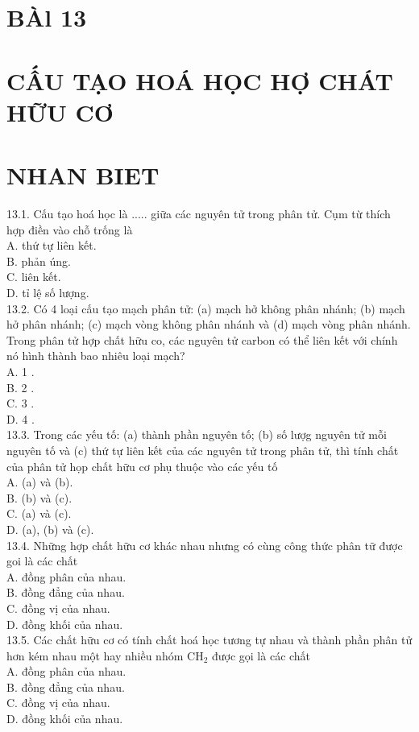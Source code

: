 \documentclass[10pt]{article}
\begin{document}
\section*{BÀl 13}
\section*{CẤU TẠO HOÁ HỌC HỢ CHÁT HỮU CƠ}
\section*{NHAN BIET}
13.1. Cấu tạo hoá học là ..... giữa các nguyên tử trong phân tử. Cụm từ thích hợp điền vào chỗ trống là\\
A. thứ tự liên kết.\\
B. phản úng.\\
C. liên kết.\\
D. tỉ lệ số lượng.\\
13.2. Có 4 loại cấu tạo mạch phân tử: (a) mạch hở không phân nhánh; (b) mạch hở phân nhánh; (c) mạch vòng không phân nhánh và (d) mạch vòng phân nhánh. Trong phân tử hợp chất hữu co, các nguyên tử carbon có thể liên kết với chính nó hình thành bao nhiêu loại mạch?\\
A. 1 .\\
B. 2 .\\
C. 3 .\\
D. 4 .\\
13.3. Trong các yếu tố: (a) thành phần nguyên tố; (b) số lượg nguyên tử mỗi nguyên tố và (c) thứ tự liên kết của các nguyên tử trong phân tử, thì tính chất của phân tử họp chất hữu cơ phụ thuộc vào các yếu tố\\
A. (a) và (b).\\
B. (b) và (c).\\
C. (a) và (c).\\
D. (a), (b) và (c).\\
13.4. Những hợp chất hữu cơ khác nhau nhưng có cùng công thức phân tữ được goi là các chất\\
A. đồng phân của nhau.\\
B. đồng đẳng của nhau.\\
C. đồng vị của nhau.\\
D. đồng khối của nhau.\\
13.5. Các chất hữu cơ có tính chất hoá học tương tự nhau và thành phần phân tử hơn kém nhau một hay nhiều nhóm $\mathrm{CH}_{2}$ được gọi là các chất\\
A. đồng phân của nhau.\\
B. đồng đẳng của nhau.\\
C. đồng vị của nhau.\\
D. đồng khối của nhau.
\end{document}
